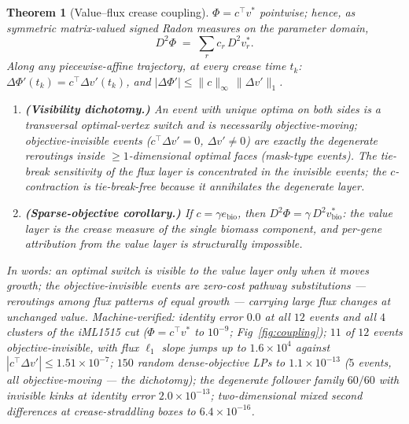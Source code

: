 \documentclass[11pt,a4paper]{article}
\theoremstyle{plain}
\newtheorem{theorem}{Theorem}[section]
\theoremstyle{definition}
\theoremstyle{remark}
\begin{document}
\begin{theorem}[Value--flux crease coupling]\label{thm:coupling}
$\Phi = c^\top v^*$ pointwise; hence, as symmetric matrix-valued
signed Radon measures on the parameter domain,
\[
D^2\Phi \;=\; \sum_{r} c_r\, D^2 v^*_r .
\]
Along any piecewise-affine trajectory, at every crease time $t_k$:
$\Delta\Phi'(t_k) = c^\top \Delta v'(t_k)$, and
$|\Delta\Phi'| \le \|c\|_\infty \,\|\Delta v'\|_1$.
\begin{enumerate}[label=(\roman*),leftmargin=2em]
\item \textbf{(Visibility dichotomy.)} An event with unique optima
      on both sides is a transversal optimal-vertex switch and is
      necessarily objective-moving; objective-invisible events
      ($c^\top \Delta v' = 0$, $\Delta v' \neq 0$) are exactly the
      degenerate reroutings inside $\ge 1$-dimensional optimal faces
      (mask-type events). The tie-break sensitivity of the flux layer
      is concentrated in the invisible events; the $c$-contraction is
      tie-break-free because it annihilates the degenerate layer.
\item \textbf{(Sparse-objective corollary.)} If $c =
      \gamma e_{\mathrm{bio}}$, then $D^2\Phi = \gamma\, D^2
      v^*_{\mathrm{bio}}$: the value layer is the crease measure of
      the single biomass component, and per-gene attribution from the
      value layer is structurally impossible.
\end{enumerate}
In words: an optimal switch is visible to the value layer only when it
moves growth; the objective-invisible events are zero-cost pathway
substitutions --- reroutings among flux patterns of equal growth ---
carrying large flux changes at unchanged value.
Machine-verified: identity error $0.0$ at all $12$ events and all
$4$ clusters of the iML1515 cut ($\Phi = c^\top v^*$ to $10^{-9}$;
Fig~\ref{fig:coupling});
$11$ of $12$ events objective-invisible, with flux $\ell_1$ slope
jumps up to $1.6 \times 10^{4}$ against $|c^\top \Delta v'| \le
1.51 \times 10^{-7}$; $150$ random dense-objective LPs to $1.1 \times
10^{-13}$ ($5$ events, all objective-moving --- the dichotomy); the
degenerate follower family $60/60$ with invisible kinks at identity
error $2.0 \times 10^{-13}$; two-dimensional mixed second
differences at crease-straddling boxes to $6.4 \times 10^{-16}$.
\end{theorem}
\end{document}
